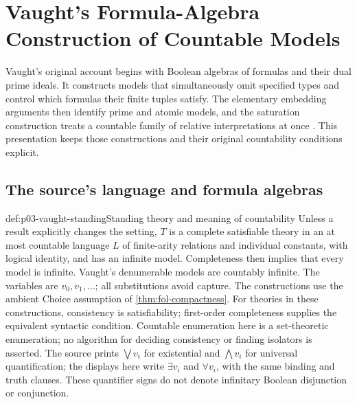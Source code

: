 \section{Vaught's Formula-Algebra Construction of Countable Models}
\label{sec:p03-n-a-003-01}

Vaught's original account begins with Boolean algebras of formulas and
their dual prime ideals. It constructs models that simultaneously omit
specified types and control which formulas their finite tuples satisfy.
The elementary embedding arguments then identify prime and atomic models,
and the saturation construction treats a countable family of relative
interpretations at once \cite[Secs.~1--4, pp.~304--314]{Vaught1961}.
This presentation keeps those constructions and their original
countability conditions explicit.

\subsection{The source's language and formula algebras}
\label{sec:p03-vaught-formula-algebras}

\begin{hbconvention}{def:p03-vaught-standing}{Standing theory and meaning of countability}
Unless a result explicitly changes the setting, \(T\) is a complete
satisfiable theory in an at most countable language \(L\) of finite-arity
relations and individual constants, with logical identity, and has an
infinite model. Completeness then implies that every model is infinite.
Vaught's denumerable models are countably infinite.
The variables are \(v_0,v_1,\ldots\); all substitutions avoid capture.
The constructions use the ambient Choice assumption of
\cref{thm:fol-compactness}.
For theories in these constructions, consistency is satisfiability;
first-order completeness supplies the equivalent syntactic condition.
Countable enumeration here is a set-theoretic enumeration; no algorithm
for deciding consistency or finding isolators is asserted.
The source prints \(\bigvee v_i\) for existential and
\(\bigwedge v_i\) for universal quantification; the displays here
write \(\exists v_i\) and \(\forall v_i\), with the same binding
and truth clauses. These quantifier signs do not denote infinitary
Boolean disjunction or conjunction.
\end{hbconvention}

